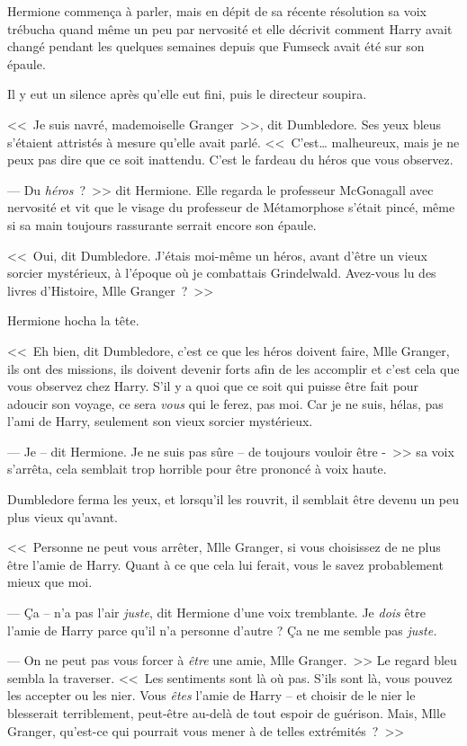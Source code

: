 Hermione commença à parler, mais en dépit de sa récente résolution sa voix trébucha quand même un peu par nervosité et elle décrivit comment Harry avait changé pendant les quelques semaines depuis que Fumseck avait été sur son épaule.

Il y eut un silence après qu'elle eut fini, puis le directeur soupira.

<<~Je suis navré, mademoiselle Granger~>>, dit Dumbledore. Ses yeux bleus s'étaient attristés à mesure qu'elle avait parlé. <<~C'est… malheureux, mais je ne peux pas dire que ce soit inattendu. C'est le fardeau du héros que vous observez.

--- Du \emph{héros}~?~>> dit Hermione. Elle regarda le professeur McGonagall avec nervosité et vit que le visage du professeur de Métamorphose s'était pincé, même si sa main toujours rassurante serrait encore son épaule.

<<~Oui, dit Dumbledore. J'étais moi-même un héros, avant d'être un vieux sorcier mystérieux, à l'époque où je combattais Grindelwald. Avez-vous lu des livres d'Histoire, Mlle Granger~?~>>

Hermione hocha la tête.

<<~Eh bien, dit Dumbledore, c'est ce que les héros doivent faire, Mlle Granger, ils ont des missions, ils doivent devenir forts afin de les accomplir et c'est cela que vous observez chez Harry. S'il y a quoi que ce soit qui puisse être fait pour adoucir son voyage, ce sera \emph{vous} qui le ferez, pas moi. Car je ne suis, hélas, pas l'ami de Harry, seulement son vieux sorcier mystérieux.

--- Je -- dit Hermione. Je ne suis pas sûre -- de toujours vouloir être -~>> sa voix s'arrêta, cela semblait trop horrible pour être prononcé à voix haute.

Dumbledore ferma les yeux, et lorsqu'il les rouvrit, il semblait être devenu un peu plus vieux qu'avant.

<<~Personne ne peut vous arrêter, Mlle Granger, si vous choisissez de ne plus être l'amie de Harry. Quant à ce que cela lui ferait, vous le savez probablement mieux que moi.

--- Ça -- n'a pas l'air \emph{juste}, dit Hermione d'une voix tremblante. Je \emph{dois} être l'amie de Harry parce qu'il n'a personne d'autre ? Ça ne me semble pas \emph{juste.}

--- On ne peut pas vous forcer à \emph{être} une amie, Mlle Granger.~>> Le regard bleu sembla la traverser. <<~Les sentiments sont là où pas. S'ils sont là, vous pouvez les accepter ou les nier. Vous \emph{êtes} l'amie de Harry -- et choisir de le nier le blesserait terriblement, peut-être au-delà de tout espoir de guérison. Mais, Mlle Granger, qu'est-ce qui pourrait vous mener à de telles extrémités~?~>>

